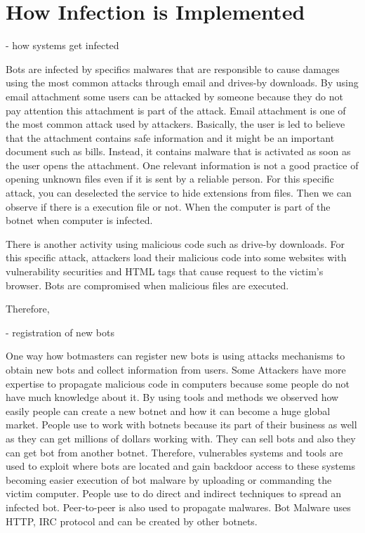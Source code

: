 \documentclass{acm_proc_article-sp}
\begin{document}
\section{How Infection is Implemented}
    - how systems get infected

Bots are infected by specifics malwares that are responsible to cause damages using the most common attacks through email and drives-by downloads. By using email attachment some users can be attacked by someone because they do not pay attention this attachment is part of the attack. Email attachment is one of the most common attack used by attackers. Basically, the user is led to believe that the attachment contains safe information and it might be an important document such as bills. Instead, it contains malware that is activated as soon as the user opens the attachment. One relevant information is not a good practice of opening unknown files even if it is sent by a reliable person. For this specific attack, you can deselected the service to hide extensions from files. Then we can observe if there is a execution file or not. When the computer is part of the botnet when computer is infected.

There is another activity using malicious code such as drive-by downloads. For this specific attack, attackers load their malicious code into some websites with vulnerability securities and HTML tags that cause request to the victim's browser. Bots are compromised when malicious files are executed. 

Therefore, 

    - registration of new bots

One way how botmasters can register new bots is using attacks mechanisms to obtain new bots and collect information from users. Some Attackers have more expertise to propagate malicious code in computers because some people do not have much knowledge about it. By using tools and methods we observed how easily people can create a new botnet and how it can become a huge global market. People use to work with botnets because its part of their business as well as they can get millions of dollars working with. They can sell bots and also they can get bot from another botnet. Therefore, vulnerables systems and tools are used to exploit where bots are located and gain backdoor access to these systems becoming easier execution of bot malware by uploading or commanding the victim computer. People use to do direct and indirect techniques to spread an infected bot.  Peer-to-peer is also used to propagate malwares. Bot Malware uses HTTP, IRC protocol and can be created by other botnets. 
\end{document}
